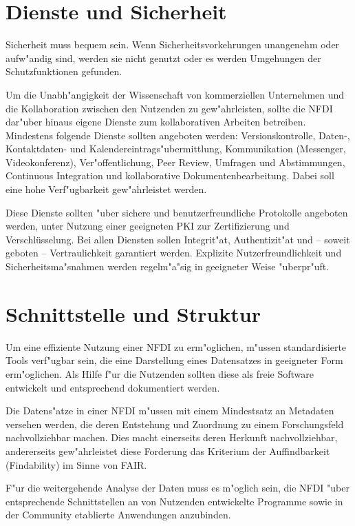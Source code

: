 \documentclass[DIV=calc]{scrartcl}
\begin{document}
\section{Dienste und Sicherheit}

Sicherheit muss bequem sein. 
Wenn Sicherheitsvorkehrungen unangenehm oder aufw"andig sind, werden sie nicht genutzt oder es werden Umgehungen der Schutzfunktionen gefunden.

Um die Unabh"angigkeit der Wissenschaft von kommerziellen Unternehmen und die Kollaboration zwischen den Nutzenden zu gew"ahrleisten, sollte die NFDI dar"uber hinaus eigene Dienste zum kollaborativen Arbeiten betreiben. 
Mindestens folgende Dienste sollten angeboten werden: 
Versionskontrolle, Daten-, Kontaktdaten- und Kalendereintrags"ubermittlung, Kommunikation (Messenger, Videokonferenz), Ver"offentlichung, Peer Review, Umfragen und Abstimmungen, Continuous Integration und kollaborative Dokumentenbearbeitung. 
Dabei soll eine hohe Verf"ugbarkeit gew"ahrleistet werden.

Diese Dienste sollten "uber sichere und benutzerfreundliche Protokolle angeboten werden, unter Nutzung einer geeigneten PKI zur Zertifizierung und Verschlüsselung.
Bei allen Diensten sollen Integrit"at, Authentizit"at und -- soweit geboten -- Vertraulichkeit garantiert werden. 
Explizite Nutzerfreundlichkeit und Sicherheitsma"snahmen werden regelm"a"sig in geeigneter Weise "uberpr"uft.


\section{Schnittstelle und Struktur}
\label{sec:schnittsstelle}

Um eine effiziente Nutzung einer NFDI zu erm"oglichen, m"ussen standardisierte Tools verf"ugbar sein, die eine Darstellung eines Datensatzes in geeigneter Form erm"oglichen. Als Hilfe f"ur die Nutzenden sollten diese als freie Software entwickelt und entsprechend dokumentiert werden. 

Die Datens"atze in einer NFDI m"ussen mit einem Mindestsatz an Metadaten versehen werden, die deren Entstehung und Zuordnung zu einem Forschungsfeld nachvollziehbar machen. Dies macht einerseits deren Herkunft nachvollziehbar, andererseits gew"ahrleistet diese Forderung das Kriterium der Auffindbarkeit (Findability) im Sinne von FAIR.

F"ur die weitergehende Analyse der Daten muss es m"oglich sein, die NFDI "uber entsprechende Schnittstellen an von Nutzenden entwickelte Programme sowie in der Community etablierte Anwendungen anzubinden.
\end{document}
